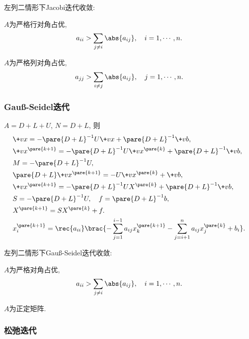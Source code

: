 \documentclass[hidelinks]{ctexart}
\begin{document}
\begin{theorem}
    左列二情形下Jacobi迭代收敛:
    \begin{cenum}
        \item $A$为严格行对角占优,
        \[ a_{ii} > \sum_{j\neq i}\abs{a_{ij}},\quad i = 1,\cdots,n. \]
        \item $A$为严格列对角占优,
        \[ a_{jj} > \sum_{i\neq j}\abs{a_{ij}},\quad j = 1,\cdots,n. \]
    \end{cenum}
\end{theorem}


\subsubsection{\texorpdfstring{Gau\ss}{Gauss}-Seidel迭代} %
\label{ssub:gauss_seidel迭代}

$A = D+L+U$, $N=D+L$, 则
\begin{align*}
    & \+vx = -\pare{D+L}^{-1}U\+vx + \pare{D+L}^{-1}\+vb, \\
    & \+vx^{\pare{k+1}} = -\pare{D+L}^{-1}U\+vx^{\pare{k}} + \pare{D+L}^{-1}\+vb, \\
    & M = -\pare{D+L}^{-1}U, \\
    & \pare{D+L}\+vx^{\pare{k+1}} = -U\+vx^{\pare{k}}+\+vb, \\
    & \+vx^{\pare{k+1}} = -\pare{D+L}^{-1}UX^{\pare{k}} + \pare{D+L}^{-1}\+vb, \\
    & S = -\pare{D+L}^{-1}U,\quad f = \pare{D+L}^{-1}b, \\
    & X^{\pare{k+1}} = SX^{\pare{k}} + f. \\
    & x_i^{\pare{k+1}} = \rec{a_{ii}}\brac{-\sum_{j=1}^{i-1}a_{ij}x_k^{\pare{k+1}} - \sum_{j=i+1}^n a_{ij}x_j^{\pare{k}} + b_i}.
\end{align*}
\begin{theorem}
    左列二情形下Gau\ss-Seidel迭代收敛:
    \begin{cenum}
        \item $A$为严格对角占优,
        \[ a_{ii} > \sum_{j\neq i}\abs{a_{ij}},\quad i = 1,\cdots,n. \]
        \item $A$为正定矩阵.
    \end{cenum}
\end{theorem}


\subsubsection{松弛迭代} %
\label{ssub:松弛迭代}
\end{document}
